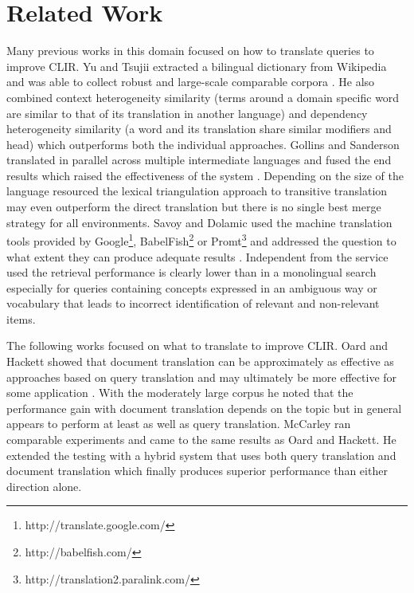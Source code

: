 \documentclass[journal]{IEEEtran}
\begin{document}



\section{Related Work}
Many previous works in this domain focused on how to translate queries to improve CLIR.
Yu and Tsujii extracted a bilingual dictionary from Wikipedia and was able to collect robust and large-scale comparable corpora \cite{yu09}.
He also combined context heterogeneity similarity (terms around a domain specific word are similar to that of its translation in another language) and dependency heterogeneity similarity (a word and its translation share similar modifiers and head) which outperforms both the individual approaches.
Gollins and Sanderson translated in parallel across multiple intermediate languages and fused the end results which raised the effectiveness of the system \cite{gollins01}.
Depending on the size of the language resourced the lexical triangulation approach to transitive translation may even outperform the direct translation but there is no single best merge strategy for all environments.
Savoy and Dolamic used the machine translation tools provided by Google\footnote{http://translate.google.com/}, BabelFish\footnote{http://babelfish.com/} or Promt\footnote{http://translation2.paralink.com/} and addressed the question to what extent they can produce adequate results \cite{savoy09}.
Independent from the service used the retrieval performance is clearly lower than in a monolingual search especially for queries containing concepts expressed in an ambiguous way or vocabulary that leads to incorrect identification of relevant and non-relevant items.

The following works focused on what to translate to improve CLIR.
Oard and Hackett showed that document translation can be approximately as effective as approaches based on query translation and may ultimately be more effective for some application \cite{oard97b}.
With the moderately large corpus he noted that the performance gain with document translation depends on the topic but in general appears to perform at least as well as query translation.
McCarley \cite{mccarley99} ran comparable experiments and came to the same results as Oard and Hackett.
He extended the testing with a hybrid system that uses both query translation and document translation which finally produces superior performance than either direction alone.
\end{document}

